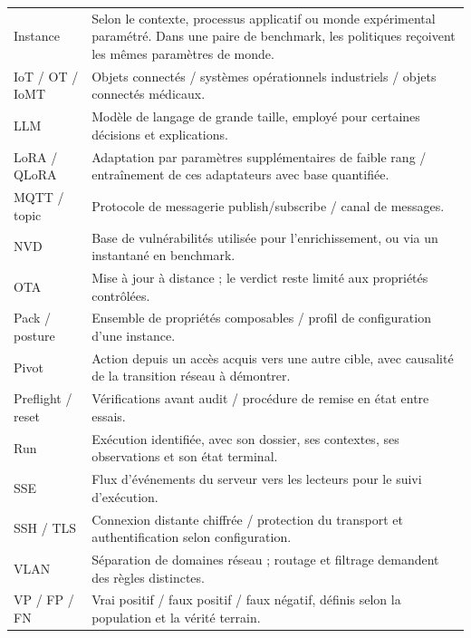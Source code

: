 \documentclass[11pt,a4paper]{article}
\begin{document}
\begin{longtable}{@{}>{\raggedright\arraybackslash}p{27mm}>{\raggedright\arraybackslash}p{128mm}@{}}
Instance & Selon le contexte, processus applicatif ou monde expérimental paramétré. Dans une paire de benchmark, les politiques reçoivent les mêmes paramètres de monde.\\
IoT / OT / IoMT & Objets connectés / systèmes opérationnels industriels / objets connectés médicaux.\\
LLM & Modèle de langage de grande taille, employé pour certaines décisions et explications.\\
LoRA / QLoRA & Adaptation par paramètres supplémentaires de faible rang / entraînement de ces adaptateurs avec base quantifiée.\\
MQTT / topic & Protocole de messagerie publish/subscribe / canal de messages.\\
NVD & Base de vulnérabilités utilisée pour l'enrichissement, ou via un instantané en benchmark.\\
OTA & Mise à jour à distance ; le verdict reste limité aux propriétés contrôlées.\\
Pack / posture & Ensemble de propriétés composables / profil de configuration d'une instance.\\
Pivot & Action depuis un accès acquis vers une autre cible, avec causalité de la transition réseau à démontrer.\\
Preflight / reset & Vérifications avant audit / procédure de remise en état entre essais.\\
Run & Exécution identifiée, avec son dossier, ses contextes, ses observations et son état terminal.\\
SSE & Flux d'événements du serveur vers les lecteurs pour le suivi d'exécution.\\
SSH / TLS & Connexion distante chiffrée / protection du transport et authentification selon configuration.\\
VLAN & Séparation de domaines réseau ; routage et filtrage demandent des règles distinctes.\\
VP / FP / FN & Vrai positif / faux positif / faux négatif, définis selon la population et la vérité terrain.\\
\end{longtable}
\normalsize
\end{document}
